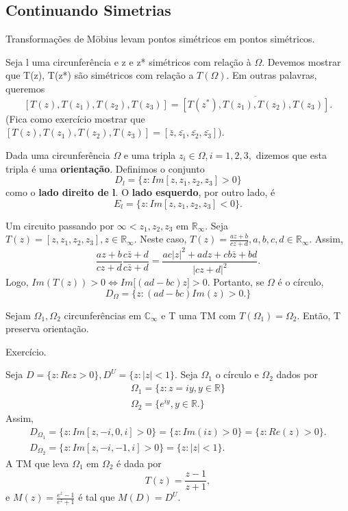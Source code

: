 \documentclass[ComplexAnalysis/complex.tex]{subfiles}
\begin{document}
\subsection{Continuando Simetrias}
\begin{prop*}
	Transformações de M\"{o}bius levam pontos simétricos em pontos simétricos.
\end{prop*}
\begin{proof*}
	Seja l uma circunferência e z e z* simétricos com relação à $\Omega.$  Devemos mostrar que T(z), T(z*) são simétricos
	com relação a $T(\Omega)$. Em outras palavras, queremos
	$$
		[T(z), T(z_{1}), T(z_2), T(z_3)] = \overline{[T(z^*), T(z_1), T(z_2), T(z_3)]}.
	$$
	(Fica como exercício mostrar que $[T(z), T(z_{1}), T(z_2), T(z_3)] = [\bar{z}, \bar{z_1}, \bar{z_2}, \bar{z_3}]$).
\end{proof*}
\begin{def*}
	Dada uma circunferência $\Omega$ e uma tripla $z_{i}\in \Omega, i = 1, 2, 3,$ dizemos que esta tripla é uma \textbf{orientação}.
	Definimos o conjunto
	$$
		D_{l} = \{z: Im[z, z_1, z_2, z_3] > 0\}
	$$
	como o \textbf{lado direito de l}. O \textbf{lado esquerdo}, por outro lado, é
	$$
		E_{l} = \{z: Im[z, z_1, z_2, z_3] < 0\}.
	$$
\end{def*}
\begin{example}
	Um circuito passando por $\infty < z_1, z_2, z_3\text{ em }\mathbb{R}_\infty.$ Seja $T(z) = [z, z_1, z_2, z_3], z\in \mathbb{R}_\infty$.
	Neste caso, $T(z) = \frac{az + b}{cz + d}, a, b, c, d\in \mathbb{R}_\infty$. Assim,
	$$
		\frac{az + b}{cz + d}\frac{c\bar{z} + d}{c\bar{z} + d} = \frac{ac|z|^2 + adz + cb\bar{z} + bd}{|cz+d|^2}.
	$$
	Logo, $Im(T(z)) > 0\Longleftrightarrow Im\biggl[(ad-bc)z\biggr] > 0.$ Portanto, se $\Omega$ é o círculo,
	$$
		D_{\Omega} = \{z: (ad - bc)Im(z) > 0.\}
	$$
\end{example}
\begin{prop*}
	Sejam $\Omega_1, \Omega_2$ circunferências em $\mathbb{C}_\infty$ e T uma TM com $T(\Omega_1) = \Omega_2.$ Então, T preserva
	orientação.
\end{prop*}
\begin{proof*}
	Exercício.
\end{proof*}
\begin{example}
	Seja $D = \{z: Re z > 0\}, D^U = \{z: |z| < 1\} $. Seja $\Omega_1$ o círculo e $\Omega_2$ dados por
	\begin{align*}
		\Omega_1 = \{z: z = iy, y\in \mathbb{R}\} \\
		\Omega_2 = \{e^{iy}, y\in \mathbb{R}.\}
	\end{align*}
	Assim,
	\begin{align*}
		D_{\Omega_1} = \{z: Im[z, -i, 0, i] > 0\} = \{z: Im(iz) > 0\} = \{z: Re(z) > 0\}. \\
		D_{\Omega_2} = \{z: Im[z, -i, -1, i] > 0\} = \{z: |z| < 1\}.
	\end{align*}
	A TM que leva $\Omega_1\text{ em }\Omega_2$ é dada por
	$$
		T(z) = \frac{z-1}{z+1},
	$$
	e $M(z) = \frac{e^{z} - 1}{e^{z} + 1}$ é tal que $M(D) = D^U.$
\end{example}
\end{document}
